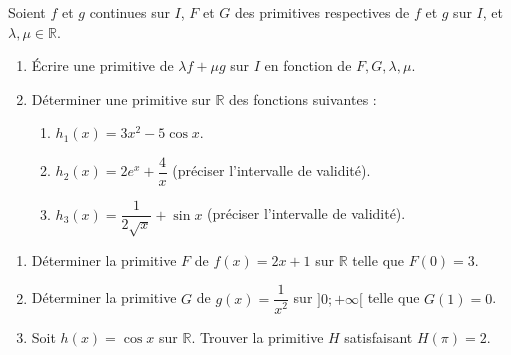 \documentclass[11pt]{article}
\begin{document}
\begin{exercice}
Soient $f$ et $g$ continues sur $I$, $F$ et $G$ des primitives respectives de $f$ et $g$ sur $I$, et $\lambda, \mu \in \mathbb{R}$.
\begin{enumerate}
    \item Écrire une primitive de $\lambda f + \mu g$ sur $I$ en fonction de $F, G, \lambda, \mu$.
    \item Déterminer une primitive sur $\mathbb{R}$ des fonctions suivantes :
    \begin{enumerate}
        \item $h_1(x) = 3x^2 - 5\cos x$.
        \item $h_2(x) = 2e^x + \dfrac{4}{x}$ (préciser l'intervalle de validité).
        \item $h_3(x) = \dfrac{1}{2\sqrt{x}} + \sin x$ (préciser l'intervalle de validité).
    \end{enumerate}
\end{enumerate}
\end{exercice}

\begin{exercice}
\begin{enumerate}
    \item Déterminer la primitive $F$ de $f(x) = 2x + 1$ sur $\mathbb{R}$ telle que $F(0) = 3$.
    \item Déterminer la primitive $G$ de $g(x) = \dfrac{1}{x^2}$ sur $]0; +\infty[$ telle que $G(1) = 0$.
    \item Soit $h(x) = \cos x$ sur $\mathbb{R}$. Trouver la primitive $H$ satisfaisant $H(\pi) = 2$.
\end{enumerate}
\end{exercice}
\end{document}
